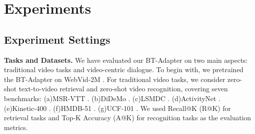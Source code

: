 \documentclass{article} \usepackage{iclr2024_conference,times}
\begin{document}
\begin{table*}[t]
{\begin{tabular}{l|c|ccc|ccc|ccc|ccc}
\bottomrule
\end{tabular}}
\vspace{-0.5em}
\label{zs_retrieval}
\end{table*}

\begin{table*}[t]
\setlength{\tabcolsep}{3pt}
\centering
\caption{The results of video conversation on video-based generative
performance benchmarking. FT and ZS mean with and without video instruction tuning respectively.}
\vspace{-0.8em}
\label{chat_generate}
\end{table*}

\section{Experiments} \label{exp}
\vspace{-0.5em}

\subsection{Experiment Settings} 
\noindent \textbf{Tasks and Datasets.}
We have evaluated our BT-Adapter on two main aspects: traditional video tasks and video-centric dialogue. To begin with, we pretrained the BT-Adapter on WebVid-2M \citep{bain2021frozen}. For traditional video tasks, we consider zero-shot text-to-video retrieval and zero-shot video recognition, covering seven benchmarks: (a)MSR-VTT \citep{xu2016msr}. (b)DiDeMo \citep{anne2017localizing}. (c)LSMDC \citep{rohrbach2017movie}. (d)ActivityNet \citep{caba2015activitynet}. (e)Kinetic-400 \citep{carreira2017quo}. (f)HMDB-51 \citep{kuehne2011hmdb}. (g)UCF-101 \citep{soomro2012ucf101}. We used Recall@K (R@K) for retrieval tasks and Top-K Accuracy (A@K) for recognition tasks as the evaluation metrics.
\end{document}
